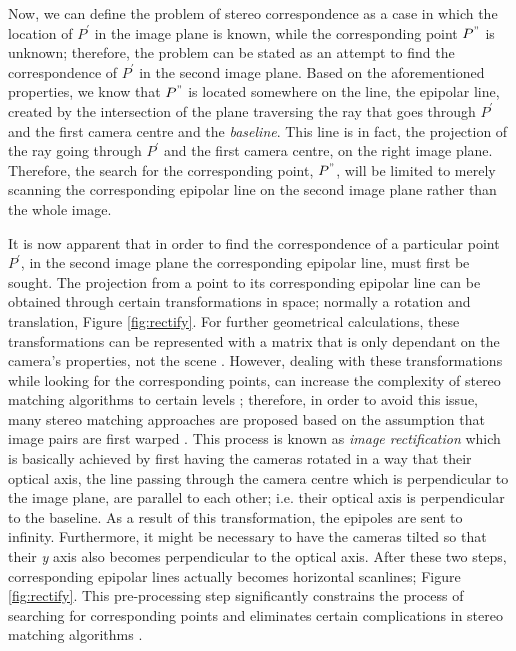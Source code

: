 \documentclass[12pt]{report}
\begin{document}
Now, we can define the problem of stereo correspondence as a case in which the location of $P^{'}$ in the image plane is known, while the
corresponding point $P^{"}$ is unknown; therefore, the problem can be stated as an attempt to find the correspondence of $P^{'}$ in the second image plane. Based on the aforementioned 
properties, we know that $P^{"}$ is located somewhere on the line, the epipolar line,
created by the intersection of the plane traversing the ray that goes through $P^{'}$ and the first camera centre and the {\it baseline}. This line is in fact, the projection of the ray going
through $P^{'}$ and the first camera centre, on the right image plane. Therefore, the search for the corresponding point, $P^{"}$, will be limited to merely scanning the corresponding 
epipolar line on the second image plane rather than the whole image.


It is now apparent that in order to find the correspondence of a particular point $P^{'}$, in the second image plane
the corresponding epipolar line, must first be sought. 
The projection from a point to its corresponding epipolar line can be obtained through certain transformations in space; normally a rotation and translation, Figure \ref{fig:rectify}.
For further geometrical calculations, these transformations can be represented
with a matrix that is only dependant on the camera's properties, not the scene \cite{hart2000}.
However, dealing with these transformations while looking for the corresponding points, can increase the complexity of stereo matching algorithms to certain levels \cite{sze11}; therefore, 
in order to avoid this issue, many stereo matching approaches are proposed based on the assumption that image pairs are first warped \cite{sze11}.
This process is known as {\it image rectification} which is basically achieved by first having the cameras rotated in a way that their optical axis, 
the line passing through the camera centre which is perpendicular to the image plane, are parallel to each other; 
i.e. their optical axis is perpendicular to the baseline. As a result of this transformation, the epipoles are sent to infinity. 
Furthermore, it might be necessary to have the cameras tilted so that their {\it y} axis also becomes perpendicular to the optical axis. 
After these two steps, corresponding epipolar lines actually becomes horizontal scanlines; Figure \ref{fig:rectify}. This pre-processing step significantly constrains the process of searching 
for corresponding points and eliminates certain complications in stereo matching algorithms \cite{sze11}. \newline 
\end{document}
